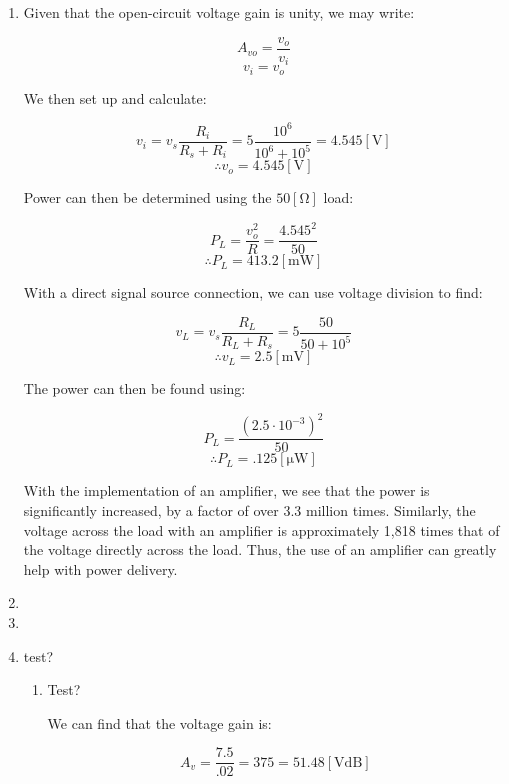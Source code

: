 \begin{enumerate}

  \item

    \begin{center}
      Given that the open-circuit voltage gain is unity, we may write:
    \end{center}
    $$A_{vo}=\frac{v_o}{v_i}$$
    $$v_i=v_o$$
    \begin{center}
      We then set up and calculate:
    \end{center}
    $$v_i=v_s\frac{R_i}{R_s+R_i}=5\frac{10^6}{10^6+10^5}=4.545[\si{\volt}]$$
    $$\boxed{\therefore v_o=4.545[\si{\volt}]}$$

    \begin{center}
      Power can then be determined using the $50[\si{\ohm}]$ load:
    \end{center}
    $$P_L=\frac{v_o^2}{R}=\frac{4.545^2}{50}$$
    $$\boxed{\therefore P_L=413.2[\si{\milli\watt}]}$$

    \begin{center}
      With a direct signal source connection, we can use voltage division to find:
    \end{center}
    $$v_L=v_s\frac{R_L}{R_L+R_s}=5\frac{50}{50+10^5}$$
    $$\boxed{\therefore v_L=2.5[\si{\milli\volt}]}$$

    \begin{center}
      The power can then be found using:
    \end{center}
    $$P_L=\frac{(2.5\cdot10^{-3})^2}{50}$$
    $$\boxed{\therefore P_L=.125[\si{\micro\watt}]}$$

    With the implementation of an amplifier, we see that the power is significantly increased, by a factor of over 3.3 million times. Similarly, the voltage across the load with an amplifier is approximately 1,818 times that of the voltage directly across the load. Thus, the use of an amplifier can greatly help with power delivery.

  \item

  \item

  \item test?

    \begin{enumerate}

      \item Test?

        \begin{center}
          We can find that the voltage gain is:
        \end{center}
        $$\boxed{A_{v}=\frac{7.5}{.02}=375=51.48[\si{\volt}\text{dB}]}$$


\end{enumerate}
\end{enumerate}
